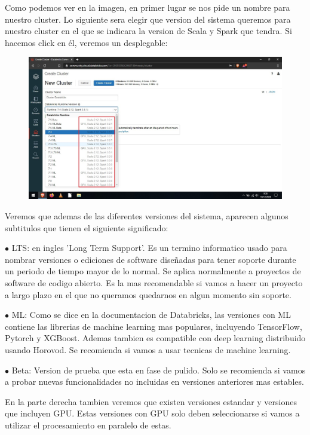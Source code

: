 \documentclass[a4paper,10pt]{article}
\begin{document}
Como podemos ver en la imagen, en primer lugar se nos pide un nombre para nuestro cluster. Lo siguiente sera elegir que version del sistema queremos para nuestro cluster en el que se indicara la version de Scala y Spark que tendra. Si hacemos click en él, veremos un desplegable:

\begin{figure}[H]
\begin{center}
\includegraphics[width=500pt]{./fotos/Databricks/7 - Databricks (V).jpg}
\end{center}
\end{figure}

Veremos que ademas de las diferentes versiones del sistema, aparecen algunos subtitulos que tienen el siguiente significado:

$\bullet$ LTS: en ingles 'Long Term Support'. Es un termino informatico usado para nombrar versiones o ediciones de software diseñadas para tener soporte durante un periodo de tiempo mayor de lo normal. Se aplica normalmente a proyectos de software de codigo abierto. Es la mas recomendable si vamos a hacer un proyecto a largo plazo en el que no queramos quedarnos en algun momento sin soporte.

$\bullet$ ML: Como se dice en la documentacion de Databricks, las versiones con ML contiene las librerias de machine learning mas populares, incluyendo TensorFlow, Pytorch y XGBoost. Ademas tambien es compatible con deep learning distribuido usando Horovod. Se recomienda si vamos a usar tecnicas de machine learning.

$\bullet$ Beta: Version de prueba que esta en fase de pulido. Solo se recomienda si vamos a probar nuevas funcionalidades no incluidas en versiones anteriores mas estables.

En la parte derecha tambien veremos que existen versiones estandar y versiones que incluyen GPU. Estas versiones con GPU solo deben seleccionarse si vamos a utilizar el procesamiento en paralelo de estas.
\end{document}
